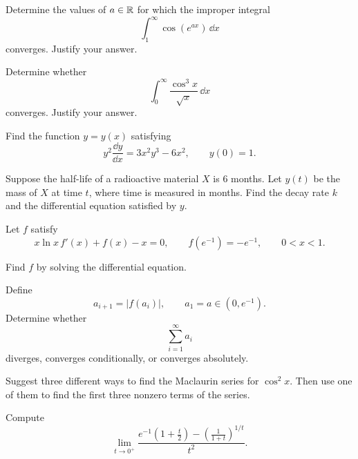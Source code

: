 \begin{problem}
\begin{problemsubparts}
\item Determine the values of $a\in\mathbb{R}$ for which the improper integral
\[
\int_1^\infty \cos(e^{ax})\,\dd x
\]
converges. Justify your answer.
\item Determine whether
\[
\int_0^\infty\frac{\cos^3 x}{\sqrt{x}}\,\dd x
\]
converges. Justify your answer.
\end{problemsubparts}
\end{problem}

\begin{problem}
\begin{problemsubparts}
\item Find the function $y=y(x)$ satisfying
\[
y^2\frac{\dd y}{\dd x}=3x^2y^3-6x^2,
\qquad
y(0)=1.
\]
\item Suppose the half-life of a radioactive material $X$ is $6$ months. Let $y(t)$ be the mass of $X$ at time $t$, where time is measured in months. Find the decay rate $k$ and the differential equation satisfied by $y$.
\end{problemsubparts}
\end{problem}

\begin{problem}
Let $f$ satisfy
\[
x\ln x\,f'(x)+f(x)-x=0,
\qquad
f(e^{-1})=-e^{-1},
\qquad
0<x<1.
\]
\begin{problemsubparts}
\item Find $f$ by solving the differential equation.
\item Define
\[
a_{i+1}=|f(a_i)|,
\qquad
a_1=a\in(0, e^{-1}).
\]
Determine whether
\[
\sum_{i=1}^{\infty}a_i
\]
diverges, converges conditionally, or converges absolutely.
\end{problemsubparts}
\end{problem}

\begin{problem}
\begin{problemsubparts}
\item Suggest three different ways to find the Maclaurin series for $\cos^2 x$. Then use one of them to find the first three nonzero terms of the series.
\item Compute
\[
\lim_{t\to0^+}
\frac{
 e^{-1}\left(1+\frac{t}{2}\right)
 -\left(\frac{1}{1+t}\right)^{1/t}
}{t^2}.
\]
\end{problemsubparts}
\end{problem}

